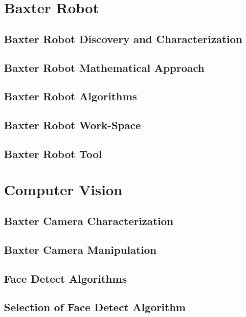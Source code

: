 \documentclass[11pt]{report} %
\begin{document}
\chapter{Baxter Robot}

\section{Baxter Robot Discovery and Characterization}

\section{Baxter Robot Mathematical Approach}

\section{Baxter Robot Algorithms}

\section{Baxter Robot Work-Space}

\section{Baxter Robot Tool}

\chapter{Computer Vision}

\section{Baxter Camera Characterization}

\section{Baxter Camera Manipulation}

\section{Face Detect Algorithms}

\section{Selection of Face Detect Algorithm}
\end{document}
